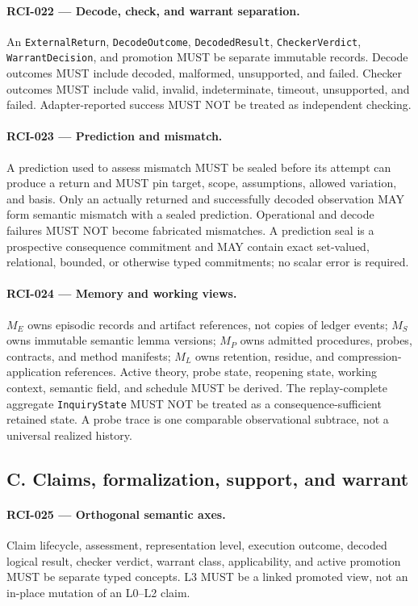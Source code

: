 \documentclass[11pt]{article}
\begin{document}
\paragraph{RCI-022 --- Decode, check, and warrant separation.}
An \texttt{ExternalReturn}, \texttt{DecodeOutcome}, \texttt{DecodedResult},
\texttt{CheckerVerdict}, \texttt{WarrantDecision}, and promotion MUST be
separate immutable records. Decode outcomes MUST include decoded, malformed,
unsupported, and failed. Checker outcomes MUST include valid, invalid,
indeterminate, timeout, unsupported, and failed. Adapter-reported success MUST
NOT be treated as independent checking.

\paragraph{RCI-023 --- Prediction and mismatch.}
A prediction used to assess mismatch MUST be sealed before its attempt can
produce a return and MUST pin target, scope, assumptions, allowed variation,
and basis. Only an actually returned and successfully decoded observation MAY
form semantic mismatch with a sealed prediction. Operational and decode
failures MUST NOT become fabricated mismatches. A prediction seal is a
prospective consequence commitment and MAY contain exact set-valued,
relational, bounded, or otherwise typed commitments; no scalar error is
required.

\paragraph{RCI-024 --- Memory and working views.}
\(M_E\) owns episodic records and artifact references, not copies of ledger
events; \(M_S\) owns immutable semantic lemma versions; \(M_P\) owns admitted
procedures, probes, contracts, and method manifests; \(M_L\) owns retention,
residue, and compression-application references. Active theory, probe state,
reopening state, working context, semantic field, and schedule MUST be derived.
The replay-complete aggregate \texttt{InquiryState} MUST NOT be treated as a
consequence-sufficient retained state. A probe trace is one comparable
observational subtrace, not a universal realized history.

\subsection{C. Claims, formalization, support, and warrant}

\paragraph{RCI-025 --- Orthogonal semantic axes.}
Claim lifecycle, assessment, representation level, execution outcome, decoded
logical result, checker verdict, warrant class, applicability, and active
promotion MUST be separate typed concepts. L3 MUST be a linked promoted view,
not an in-place mutation of an L0--L2 claim.
\end{document}
